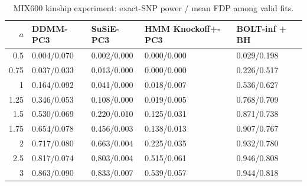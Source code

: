 \begin{table}[htbp]\centering\small
\caption{MIX600 kinship experiment: exact-SNP power / mean FDP among valid fits.}
\begin{tabular}{rllll}\toprule
$a$ & DDMM-PC3 & SuSiE-PC3 & HMM Knockoff+-PC3 & BOLT-inf + BH\\\midrule
0.5 & 0.004/0.070 & 0.002/0.000 & 0.000/0.000 & 0.029/0.198\\
0.75 & 0.037/0.033 & 0.013/0.000 & 0.000/0.000 & 0.226/0.517\\
1 & 0.164/0.092 & 0.041/0.000 & 0.018/0.007 & 0.536/0.627\\
1.25 & 0.346/0.053 & 0.108/0.000 & 0.019/0.005 & 0.768/0.709\\
1.5 & 0.530/0.069 & 0.220/0.010 & 0.125/0.031 & 0.871/0.738\\
1.75 & 0.654/0.078 & 0.456/0.003 & 0.138/0.013 & 0.907/0.767\\
2 & 0.717/0.080 & 0.663/0.004 & 0.225/0.035 & 0.932/0.780\\
2.5 & 0.817/0.074 & 0.803/0.004 & 0.515/0.061 & 0.946/0.808\\
3 & 0.863/0.090 & 0.833/0.007 & 0.539/0.057 & 0.944/0.818\\
\bottomrule\end{tabular}\end{table}
